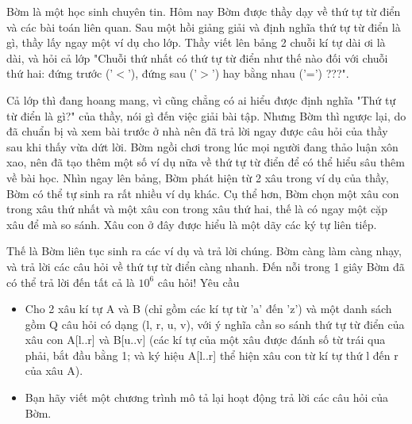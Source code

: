 Bờm là một học sinh chuyên tin. Hôm nay Bờm được thầy dạy về thứ tự từ điển và các bài toán liên quan. Sau một hồi giảng giải và định nghĩa thứ tự từ điển là gì, thầy lấy ngay một ví dụ cho lớp. Thầy viết lên bảng 2 chuỗi kí tự dài ơi là dài, và hỏi cả lớp "Chuỗi thứ nhất có thứ tự từ điển như thế nào đối với chuỗi thứ hai: đứng trước ('$<$'), đứng sau ('$>$') hay bằng nhau ('=') ???".  

   Cả lớp thì đang hoang mang, vì cũng chẳng có ai hiểu được định nghĩa "Thứ tự từ điển là gì?" của thầy, nói gì đến việc giải bài tập. Nhưng Bờm thì ngược lại, do đã chuẩn bị và xem bài trước ở nhà nên đã trả lời ngay được câu hỏi của thầy sau khi thấy vừa dứt lời. Bờm ngồi chơi trong lúc mọi người đang thảo luận xôn xao, nên đã tạo thêm một số ví dụ nữa về thứ tự từ điển để có thể hiểu sâu thêm về bài học. Nhìn ngay lên bảng, Bờm phát hiện từ 2 xâu trong ví dụ của thầy, Bờm có thể tự sinh ra rất nhiều ví dụ khác. Cụ thể hơn, Bờm chọn một xâu con trong xâu thứ nhất và một xâu con trong xâu thứ hai, thế là có ngay một cặp xâu để mà so sánh. Xâu con ở đây được hiểu là một dãy các ký tự liên tiếp.  

   Thế là Bờm liên tục sinh ra các ví dụ và trả lời chúng. Bờm càng làm càng nhạy, và trả lời các câu hỏi về thứ tự từ điển càng nhanh. Đến nỗi trong 1 giây Bờm đã có thể trả lời đến tất cả là $10^{6}$   câu hỏi!
Yêu cầu
\begin{itemize}
	\item     Cho 2 xâu kí tự A và B (chỉ gồm các kí tự từ 'a' đến 'z') và một danh sách gồm Q câu hỏi có dạng (l, r, u, v), với ý nghĩa cần so sánh thứ tự từ điển của xâu con A[l..r] và B[u..v] (các kí tự của một xâu được đánh số từ trái qua phải, bắt đầu bằng 1; và ký hiệu A[l..r] thể hiện xâu con từ kí tự thứ l đến r của xâu A).   
	\item     Bạn hãy viết một chương trình mô tả lại hoạt động trả lời các câu hỏi của Bờm.   
\end{itemize}